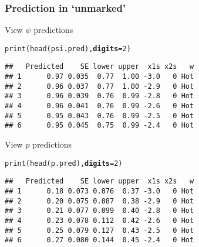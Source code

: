 \documentclass[color=usenames,dvipsnames]{beamer}\usepackage[]{graphicx}\usepackage[]{color}
\makeatletter
\newcommand{\hlnum}[1]{\textcolor[rgb]{0.69,0.494,0}{#1}}%
\newcommand{\hlstd}[1]{\textcolor[rgb]{0,0,0}{#1}}%
\newcommand{\hlkwc}[1]{\textcolor[rgb]{0,0,0}{\textbf{#1}}}%
\newcommand{\hlkwd}[1]{\textcolor[rgb]{0.004,0.004,0.506}{#1}}%
\newenvironment{kframe}{%
 \def\at@end@of@kframe{}%
 \ifinner\ifhmode%
  \def\at@end@of@kframe{\end{minipage}}%
  \begin{minipage}{\columnwidth}%
 \fi\fi%
 \def\FrameCommand##1{\hskip\@totalleftmargin \hskip-\fboxsep
 \colorbox{shadecolor}{##1}\hskip-\fboxsep
     \hskip-\linewidth \hskip-\@totalleftmargin \hskip\columnwidth}%
 \MakeFramed {\advance\hsize-\width
   \@totalleftmargin\z@ \linewidth\hsize
   \@setminipage}}%
 {\par\unskip\endMakeFramed%
 \at@end@of@kframe}
\newenvironment{knitrout}{}{} %
\makeatother
\begin{document}
\begin{frame}[fragile]
  \frametitle{Prediction in `unmarked'}
  \small
  View $\psi$ predictions
\begin{knitrout}\footnotesize
{}\color{fgcolor}\begin{kframe}
\begin{alltt}
\hlkwd{print}\hlstd{(}\hlkwd{head}\hlstd{(psi.pred),} \hlkwc{digits}\hlstd{=}\hlnum{2}\hlstd{)}
\end{alltt}
\begin{verbatim}
##   Predicted    SE lower upper  x1s x2s   w
## 1      0.97 0.035  0.77  1.00 -3.0   0 Hot
## 2      0.96 0.037  0.77  1.00 -2.9   0 Hot
## 3      0.96 0.039  0.76  0.99 -2.8   0 Hot
## 4      0.96 0.041  0.76  0.99 -2.6   0 Hot
## 5      0.95 0.043  0.76  0.99 -2.5   0 Hot
## 6      0.95 0.045  0.75  0.99 -2.4   0 Hot
\end{verbatim}
\end{kframe}
\end{knitrout}
\pause
\vfill
  View $p$ predictions
\begin{knitrout}\footnotesize
{}\color{fgcolor}\begin{kframe}
\begin{alltt}
\hlkwd{print}\hlstd{(}\hlkwd{head}\hlstd{(p.pred),} \hlkwc{digits}\hlstd{=}\hlnum{2}\hlstd{)}
\end{alltt}
\begin{verbatim}
##   Predicted    SE lower upper  x1s x2s   w
## 1      0.18 0.073 0.076  0.37 -3.0   0 Hot
## 2      0.20 0.075 0.087  0.38 -2.9   0 Hot
## 3      0.21 0.077 0.099  0.40 -2.8   0 Hot
## 4      0.23 0.078 0.112  0.42 -2.6   0 Hot
## 5      0.25 0.079 0.127  0.43 -2.5   0 Hot
## 6      0.27 0.080 0.144  0.45 -2.4   0 Hot
\end{verbatim}
\end{kframe}
\end{knitrout}
\end{frame}
\end{document}
